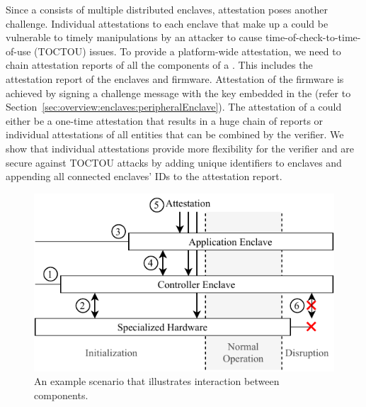 Since a \nameenclave{} consists of multiple distributed enclaves, attestation poses another challenge. Individual attestations to each enclave that make up a \nameenclave{} could be vulnerable to timely manipulations by an attacker to cause time-of-check-to-time-of-use (TOCTOU) issues. To provide a platform-wide attestation, we need to chain attestation reports of all the components of a \nameenclave. This includes the attestation report of the enclaves and \sphw firmware. Attestation of the \sphw firmware is achieved by signing a challenge message with the key embedded in the \sphw (refer to Section~\ref{sec:overview:enclaves:peripheralEnclave}).
The attestation of a \nameenclave{} could either be a one-time attestation that results in a huge chain of reports or individual attestations of all entities that can be combined by the verifier. 
We show that individual attestations provide more flexibility for the verifier and are secure against TOCTOU attacks by adding unique identifiers to enclaves and appending all connected enclaves' IDs to the attestation report.



\begin{figure}[tbp]
    \centering
    \includegraphics[width=0.7\linewidth]{chapters/PIE/images/cpu_bus_peripheral-Page-5.pdf}
    \caption[Interactions between \nameenclave's components]{An example scenario that illustrates interaction between \nameenclave components.}
    \label{fig:overviewtime}
\end{figure}

